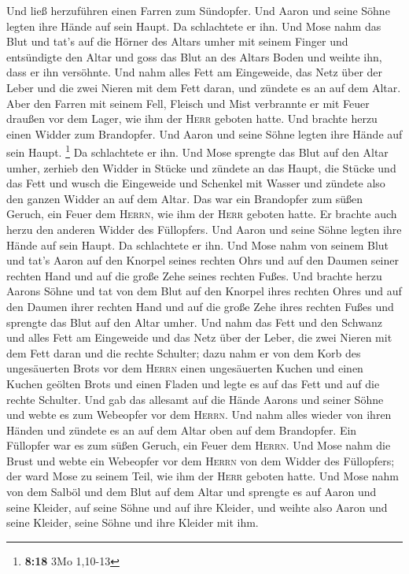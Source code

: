  Und ließ herzuführen einen Farren zum Sündopfer. Und
Aaron und seine Söhne legten ihre Hände auf sein Haupt. 
Da schlachtete er ihn. Und Mose nahm das Blut und tat's auf die Hörner
des Altars umher mit seinem Finger und entsündigte den Altar und goss
das Blut an des Altars Boden und weihte ihn, dass er ihn versöhnte.
 Und nahm alles Fett am Eingeweide, das Netz über der
Leber und die zwei Nieren mit dem Fett daran, und zündete es an auf dem
Altar.  Aber den Farren mit seinem Fell, Fleisch und Mist
verbrannte er mit Feuer draußen vor dem Lager, wie ihm der \textsc{Herr}
geboten hatte.  Und brachte herzu einen Widder zum
Brandopfer. Und Aaron und seine Söhne legten ihre Hände auf sein Haupt.
\footnote{\textbf{8:18} 3Mo 1,10-13}  Da schlachtete er
ihn. Und Mose sprengte das Blut auf den Altar umher, 
zerhieb den Widder in Stücke und zündete an das Haupt, die Stücke und
das Fett  und wusch die Eingeweide und Schenkel mit
Wasser und zündete also den ganzen Widder an auf dem Altar. Das war ein
Brandopfer zum süßen Geruch, ein Feuer dem \textsc{Herrn}, wie ihm der
\textsc{Herr} geboten hatte.  Er brachte auch herzu den
anderen Widder des Füllopfers. Und Aaron und seine Söhne legten ihre
Hände auf sein Haupt.  Da schlachtete er ihn. Und Mose
nahm von seinem Blut und tat's Aaron auf den Knorpel seines rechten Ohrs
und auf den Daumen seiner rechten Hand und auf die große Zehe seines
rechten Fußes.  Und brachte herzu Aarons Söhne und tat
von dem Blut auf den Knorpel ihres rechten Ohres und auf den Daumen
ihrer rechten Hand und auf die große Zehe ihres rechten Fußes und
sprengte das Blut auf den Altar umher.  Und nahm das Fett
und den Schwanz und alles Fett am Eingeweide und das Netz über der
Leber, die zwei Nieren mit dem Fett daran und die rechte Schulter;
 dazu nahm er von dem Korb des ungesäuerten Brots vor dem
\textsc{Herrn} einen ungesäuerten Kuchen und einen Kuchen geölten Brots
und einen Fladen und legte es auf das Fett und auf die rechte Schulter.
 Und gab das allesamt auf die Hände Aarons und seiner
Söhne und webte es zum Webeopfer vor dem \textsc{Herrn}. 
Und nahm alles wieder von ihren Händen und zündete es an auf dem Altar
oben auf dem Brandopfer. Ein Füllopfer war es zum süßen Geruch, ein
Feuer dem \textsc{Herrn}.  Und Mose nahm die Brust und
webte ein Webeopfer vor dem \textsc{Herrn} von dem Widder des
Füllopfers; der ward Mose zu seinem Teil, wie ihm der \textsc{Herr}
geboten hatte.  Und Mose nahm von dem Salböl und dem Blut
auf dem Altar und sprengte es auf Aaron und seine Kleider, auf seine
Söhne und auf ihre Kleider, und weihte also Aaron und seine Kleider,
seine Söhne und ihre Kleider mit ihm.

